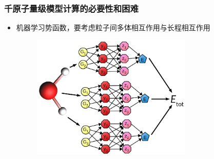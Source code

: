 \begin{frame}
	\frametitle{千原子量级模型计算的必要性和困难}
	\begin{itemize}
		\item 机器学习势函数，要考虑粒子间多体相互作用与长程相互作用
\begin{figure}[h!]
\vspace*{-0.10in}
\includegraphics[height=2.34in,width=3.00in]{Figures/MLP_GNN.jpg}
\label{Multi-Scale-4}
\end{figure}
	\end{itemize}
\end{frame}

